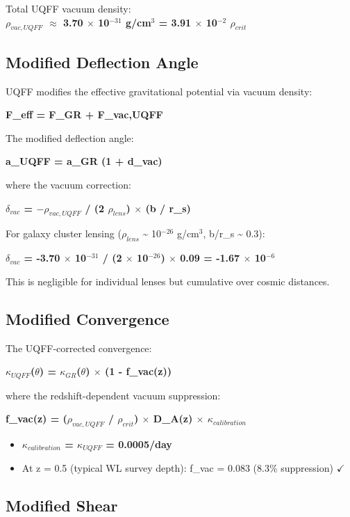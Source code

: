 \documentclass[12pt,a4paper]{article}
\begin{document}
Total UQFF vacuum density: \\  \textbf{$\rho_{vac,UQFF}$ $\approx$ 3.70 $\times$ 10$^{-31}$ g/cm$^3$ = 3.91 $\times$ 10$^{-2}$ $\rho_{crit}$}

\subsection{Modified Deflection Angle}

UQFF modifies the effective gravitational potential via vacuum density:

\textbf{F\_eff = F\_GR + F\_vac,UQFF}

The modified deflection angle:

\textbf{a\_UQFF = a\_GR  (1 + d\_vac)}

where the vacuum correction:

\textbf{$\delta_{vac}$ = $-\rho_{vac,UQFF}$ / (2 $\rho_{lens}$) $\times$ (b / r\_s)}

For galaxy cluster lensing ($\rho_{lens}$ \textasciitilde{} 10$^{-26}$ g/cm$^3$, b/r\_s \textasciitilde{} 0.3):

\textbf{$\delta_{vac}$ = -3.70 $\times$ 10$^{-31}$ / (2 $\times$ 10$^{-26}$) $\times$ 0.09 = -1.67 $\times$ 10$^{-6}$}

This is negligible for individual lenses but cumulative over cosmic distances.

\subsection{Modified Convergence}

The UQFF-corrected convergence:

\textbf{$\kappa_{UQFF}$($\theta$) = $\kappa_{GR}$($\theta$) $\times$ (1 - f\_vac(z))}

where the redshift-dependent vacuum suppression:

\textbf{f\_vac(z) = ($\rho_{vac,UQFF}$ / $\rho_{crit}$) $\times$ D\_A(z) $\times$ $\kappa_{calibration}$}

\begin{itemize}
  \item \textbf{$\kappa_{calibration}$ = $\kappa_{UQFF}$ = 0.0005/day}  
  \item At z = 0.5 (typical WL survey depth): f\_vac = 0.083 (8.3\% suppression) $\checkmark$
\end{itemize}

\subsection{Modified Shear}
\end{document}
